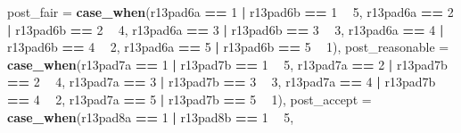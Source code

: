 \documentclass[]{book}
\newenvironment{Shaded}{\begin{snugshade}}{\end{snugshade}}
\newcommand{\KeywordTok}[1]{\textcolor[rgb]{0.13,0.29,0.53}{\textbf{#1}}}
\newcommand{\DataTypeTok}[1]{\textcolor[rgb]{0.13,0.29,0.53}{#1}}
\newcommand{\DecValTok}[1]{\textcolor[rgb]{0.00,0.00,0.81}{#1}}
\newcommand{\StringTok}[1]{\textcolor[rgb]{0.31,0.60,0.02}{#1}}
\newcommand{\OperatorTok}[1]{\textcolor[rgb]{0.81,0.36,0.00}{\textbf{#1}}}
\newcommand{\NormalTok}[1]{#1}
\begin{document}
\begin{Shaded}
\begin{Highlighting}[]
{{{{{{{         \DataTypeTok{post_fair =} \KeywordTok{case_when}\NormalTok{(r13pad6a }\OperatorTok{==}\StringTok{ }\DecValTok{1} \OperatorTok{|}\StringTok{ }\NormalTok{r13pad6b }\OperatorTok{==}\StringTok{ }\DecValTok{1} \OperatorTok{~}\StringTok{ }\DecValTok{5}\NormalTok{,}
\NormalTok{                          r13pad6a }\OperatorTok{==}\StringTok{ }\DecValTok{2} \OperatorTok{|}\StringTok{ }\NormalTok{r13pad6b }\OperatorTok{==}\StringTok{ }\DecValTok{2} \OperatorTok{~}\StringTok{ }\DecValTok{4}\NormalTok{,}
\NormalTok{                          r13pad6a }\OperatorTok{==}\StringTok{ }\DecValTok{3} \OperatorTok{|}\StringTok{ }\NormalTok{r13pad6b }\OperatorTok{==}\StringTok{ }\DecValTok{3} \OperatorTok{~}\StringTok{ }\DecValTok{3}\NormalTok{,}
\NormalTok{                          r13pad6a }\OperatorTok{==}\StringTok{ }\DecValTok{4} \OperatorTok{|}\StringTok{ }\NormalTok{r13pad6b }\OperatorTok{==}\StringTok{ }\DecValTok{4} \OperatorTok{~}\StringTok{ }\DecValTok{2}\NormalTok{,}
\NormalTok{                          r13pad6a }\OperatorTok{==}\StringTok{ }\DecValTok{5} \OperatorTok{|}\StringTok{ }\NormalTok{r13pad6b }\OperatorTok{==}\StringTok{ }\DecValTok{5} \OperatorTok{~}\StringTok{ }\DecValTok{1}\NormalTok{),}
          \DataTypeTok{post_reasonable =} \KeywordTok{case_when}\NormalTok{(r13pad7a }\OperatorTok{==}\StringTok{ }\DecValTok{1} \OperatorTok{|}\StringTok{ }\NormalTok{r13pad7b }\OperatorTok{==}\StringTok{ }\DecValTok{1} \OperatorTok{~}\StringTok{ }\DecValTok{5}\NormalTok{,}
\NormalTok{                          r13pad7a }\OperatorTok{==}\StringTok{ }\DecValTok{2} \OperatorTok{|}\StringTok{ }\NormalTok{r13pad7b }\OperatorTok{==}\StringTok{ }\DecValTok{2} \OperatorTok{~}\StringTok{ }\DecValTok{4}\NormalTok{,}
\NormalTok{                          r13pad7a }\OperatorTok{==}\StringTok{ }\DecValTok{3} \OperatorTok{|}\StringTok{ }\NormalTok{r13pad7b }\OperatorTok{==}\StringTok{ }\DecValTok{3} \OperatorTok{~}\StringTok{ }\DecValTok{3}\NormalTok{,}
\NormalTok{                          r13pad7a }\OperatorTok{==}\StringTok{ }\DecValTok{4} \OperatorTok{|}\StringTok{ }\NormalTok{r13pad7b }\OperatorTok{==}\StringTok{ }\DecValTok{4} \OperatorTok{~}\StringTok{ }\DecValTok{2}\NormalTok{,}
\NormalTok{                          r13pad7a }\OperatorTok{==}\StringTok{ }\DecValTok{5} \OperatorTok{|}\StringTok{ }\NormalTok{r13pad7b }\OperatorTok{==}\StringTok{ }\DecValTok{5} \OperatorTok{~}\StringTok{ }\DecValTok{1}\NormalTok{),}
          \DataTypeTok{post_accept =} \KeywordTok{case_when}\NormalTok{(r13pad8a }\OperatorTok{==}\StringTok{ }\DecValTok{1} \OperatorTok{|}\StringTok{ }\NormalTok{r13pad8b }\OperatorTok{==}\StringTok{ }\DecValTok{1} \OperatorTok{~}\StringTok{ }\DecValTok{5}\NormalTok{,}
}}}}}}}
\end{Highlighting}
\end{Shaded}
\end{document}
